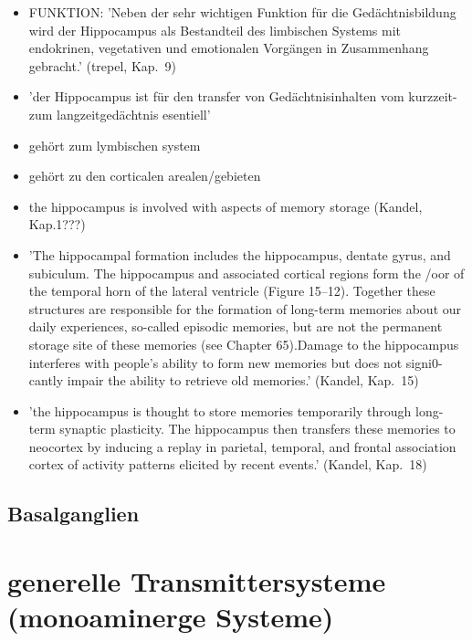 \documentclass[12pt,a4paper,pdftex]{article}
\begin{document}
\begin{itemize}
\item FUNKTION: 'Neben der sehr wichtigen Funktion für die Gedächtnisbildung wird der Hippocampus als Bestandteil des limbischen Systems mit endokrinen, vegetativen und emotionalen Vorgängen in Zusammenhang gebracht.' (trepel, Kap.~9)

\item 'der Hippocampus ist für den transfer von Gedächtnisinhalten vom kurzzeit- zum langzeitgedächtnis esentiell' \cite[Kap.~6]{storch2012lehrbuchzoo}

\item gehört zum lymbischen system \cite[Kap.~6]{storch2012lehrbuchzoo}

\item gehört zu den corticalen arealen/gebieten  \cite[Kap.~6]{storch2012lehrbuchzoo}

\item the hippocampus is involved with aspects of memory storage (Kandel, Kap.1???)

\item 'The hippocampal formation includes the hippocampus, dentate gyrus, and subiculum. The hippocampus and associated cortical regions form the /oor of the temporal horn of the lateral ventricle (Figure 15–12). Together these structures are responsible for the formation of long-term memories about our daily experiences, so-called episodic memories, but are not the permanent storage site of these memories (see Chapter 65).Damage to the hippocampus interferes with people’s ability to form new memories but does not signi0-cantly impair the ability to retrieve old memories.' (Kandel, Kap.~15)

\item 'the hippocampus is thought to store memories temporarily through long-term synaptic plasticity. The hippocampus then transfers these memories to neocortex by inducing a replay in parietal, temporal, and frontal association cortex of activity patterns elicited by recent events.' (Kandel, Kap.~18)

\end{itemize}

\subsection{Basalganglien}

\newpage
\section{generelle Transmittersysteme (monoaminerge Systeme)}
\end{document}
